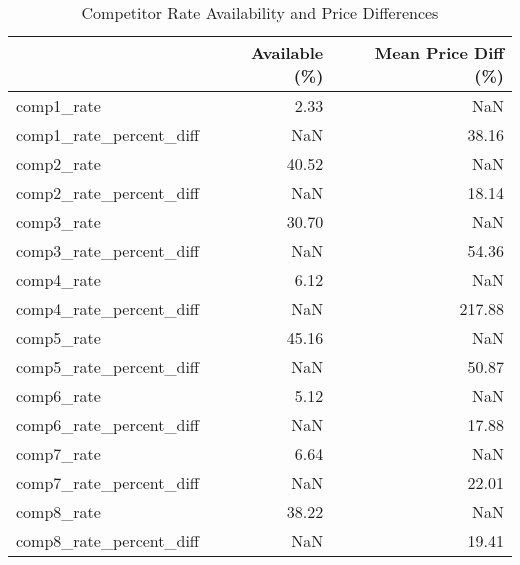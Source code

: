 \begin{table}
\caption{Competitor Rate Availability and Price Differences}
\label{tab:competitor_rates}
\begin{tabular}{lrr}
\toprule
 & Available (\%) & Mean Price Diff (\%) \\
\midrule
comp1\_rate & 2.33 & NaN \\
comp1\_rate\_percent\_diff & NaN & 38.16 \\
comp2\_rate & 40.52 & NaN \\
comp2\_rate\_percent\_diff & NaN & 18.14 \\
comp3\_rate & 30.70 & NaN \\
comp3\_rate\_percent\_diff & NaN & 54.36 \\
comp4\_rate & 6.12 & NaN \\
comp4\_rate\_percent\_diff & NaN & 217.88 \\
comp5\_rate & 45.16 & NaN \\
comp5\_rate\_percent\_diff & NaN & 50.87 \\
comp6\_rate & 5.12 & NaN \\
comp6\_rate\_percent\_diff & NaN & 17.88 \\
comp7\_rate & 6.64 & NaN \\
comp7\_rate\_percent\_diff & NaN & 22.01 \\
comp8\_rate & 38.22 & NaN \\
comp8\_rate\_percent\_diff & NaN & 19.41 \\
\bottomrule
\end{tabular}
\end{table}
